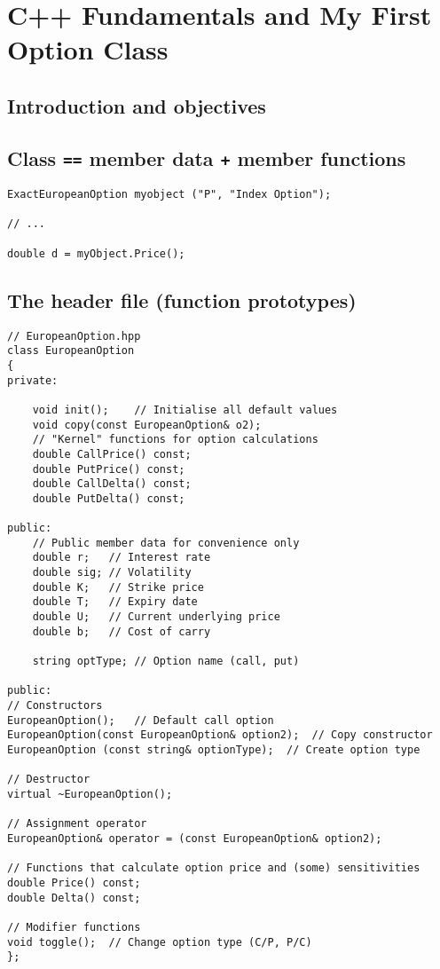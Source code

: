 \chapter{C++ Fundamentals and My First Option Class}

\section{Introduction and objectives}

\section{Class \texttt{==} member data \texttt{+} member functions}

\begin{lstlisting}
ExactEuropeanOption myobject ("P", "Index Option");

// ...

double d = myObject.Price();
\end{lstlisting}

\section{The header file (function prototypes)}


\begin{lstlisting}
// EuropeanOption.hpp
class EuropeanOption
{
private:

	void init();	// Initialise all default values
	void copy(const EuropeanOption& o2);
	// "Kernel" functions for option calculations
	double CallPrice() const;
	double PutPrice() const;
	double CallDelta() const;
	double PutDelta() const;

public:
	// Public member data for convenience only
	double r;	// Interest rate
	double sig;	// Volatility
	double K;	// Strike price
	double T;	// Expiry date
	double U;	// Current underlying price
	double b;	// Cost of carry

	string optType;	// Option name (call, put)

public:
// Constructors
EuropeanOption();	// Default call option
EuropeanOption(const EuropeanOption& option2);	// Copy constructor
EuropeanOption (const string& optionType);	// Create option type

// Destructor
virtual ~EuropeanOption();

// Assignment operator
EuropeanOption& operator = (const EuropeanOption& option2);

// Functions that calculate option price and (some) sensitivities
double Price() const;
double Delta() const;

// Modifier functions
void toggle();	// Change option type (C/P, P/C)
};
\end{lstlisting}

